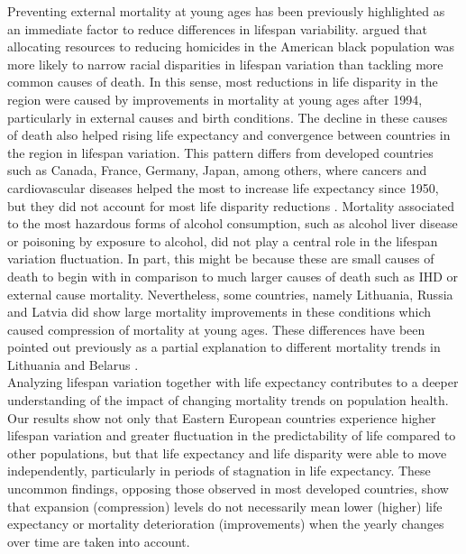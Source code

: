 \documentclass{article}
\begin{document}
\begin{spacing}{1.5}
Preventing external mortality at young ages has been previously highlighted as an immediate factor to reduce differences in lifespan variability. \citet{firebaugh2014lifespans} argued that allocating resources to reducing homicides in the American black population was more likely to narrow racial disparities in lifespan variation than tackling more common causes of death. In this sense, most reductions in life disparity in the region were caused by improvements in mortality at young ages after 1994, particularly in external causes and birth conditions. The decline in these causes of death also helped rising life expectancy and convergence between countries in the region in lifespan variation. This pattern differs from developed countries such as Canada, France, Germany, Japan, among others, where cancers and cardiovascular diseases helped the most to increase life expectancy since 1950, but they did not account for most life disparity reductions \citep{seligman2016equity}.
Mortality associated to the most hazardous forms of alcohol consumption, such as alcohol liver disease or poisoning by exposure to alcohol, did not play a central role in the lifespan variation fluctuation. In part, this might be because these are small causes of death to begin with in comparison to much larger causes of death such as IHD or external cause mortality. Nevertheless, some countries, namely Lithuania, Russia and Latvia did show large mortality improvements in these conditions which caused compression of mortality at young ages. These differences have been pointed out previously as a partial explanation to different mortality trends in Lithuania and Belarus \citep{grigoriev2015spatial}.\\

Analyzing lifespan variation together with life expectancy contributes to a deeper understanding of the impact of changing mortality trends on population health. Our results show not only that Eastern European countries experience higher lifespan variation and greater fluctuation in the predictability of life compared to other populations, but that life expectancy and life disparity were able to move independently, particularly in periods of stagnation in life expectancy. These uncommon findings, opposing those observed in most developed countries, show that expansion (compression) levels do not necessarily mean lower (higher) life expectancy  or mortality deterioration (improvements) when the yearly changes over time are taken into account. 


\end{spacing}
\end{document}
